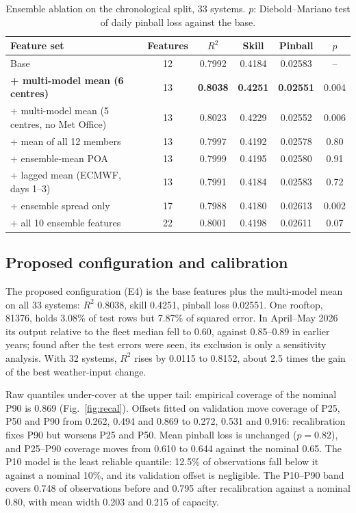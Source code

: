 \begin{table}[!htb]
\centering
\caption{Ensemble ablation on the chronological split, 33 systems. $p$: Diebold--Mariano test of daily pinball loss against the base.}
\label{tab:ablation}
\small
\begin{tabularx}{\textwidth}{@{}X c c c c c@{}}
\toprule
Feature set & Features & $R^2$ & Skill & Pinball & $p$ \\
\midrule
Base & 12 & 0.7992 & 0.4184 & 0.02583 & -- \\
\textbf{+ multi-model mean (6 centres)} & 13 & \textbf{0.8038} & \textbf{0.4251} & \textbf{0.02551} & 0.004 \\
+ multi-model mean (5 centres, no Met Office) & 13 & 0.8023 & 0.4229 & 0.02552 & 0.006 \\
+ mean of all 12 members & 13 & 0.7997 & 0.4192 & 0.02578 & 0.80 \\
+ ensemble-mean POA & 13 & 0.7999 & 0.4195 & 0.02580 & 0.91 \\
+ lagged mean (ECMWF, days 1--3) & 13 & 0.7991 & 0.4184 & 0.02583 & 0.72 \\
+ ensemble spread only & 17 & 0.7988 & 0.4180 & 0.02613 & 0.002 \\
+ all 10 ensemble features & 22 & 0.8001 & 0.4198 & 0.02611 & 0.07 \\
\bottomrule
\end{tabularx}
\end{table}

\subsection{Proposed configuration and calibration}
\label{sec:res-config}

The proposed configuration (E4) is the base features plus the multi-model mean on all 33 systems: $R^2$ 0.8038, skill 0.4251, pinball loss 0.02551. One rooftop, 81376, holds 3.08\% of test rows but 7.87\% of squared error. In April--May 2026 its output relative to the fleet median fell to 0.60, against 0.85--0.89 in earlier years; found after the test errors were seen, its exclusion is only a sensitivity analysis. With 32 systems, $R^2$ rises by 0.0115 to 0.8152, about 2.5 times the gain of the best weather-input change.

Raw quantiles under-cover at the upper tail: empirical coverage of the nominal P90 is 0.869 (Fig.~\ref{fig:recal}). Offsets fitted on validation move coverage of P25, P50 and P90 from 0.262, 0.494 and 0.869 to 0.272, 0.531 and 0.916: recalibration fixes P90 but worsens P25 and P50. Mean pinball loss is unchanged ($p = 0.82$), and P25--P90 coverage moves from 0.610 to 0.644 against the nominal 0.65. The P10 model is the least reliable quantile: 12.5\% of observations fall below it against a nominal 10\%, and its validation offset is negligible. The P10--P90 band covers 0.748 of observations before and 0.795 after recalibration against a nominal 0.80, with mean width 0.203 and 0.215 of capacity.

